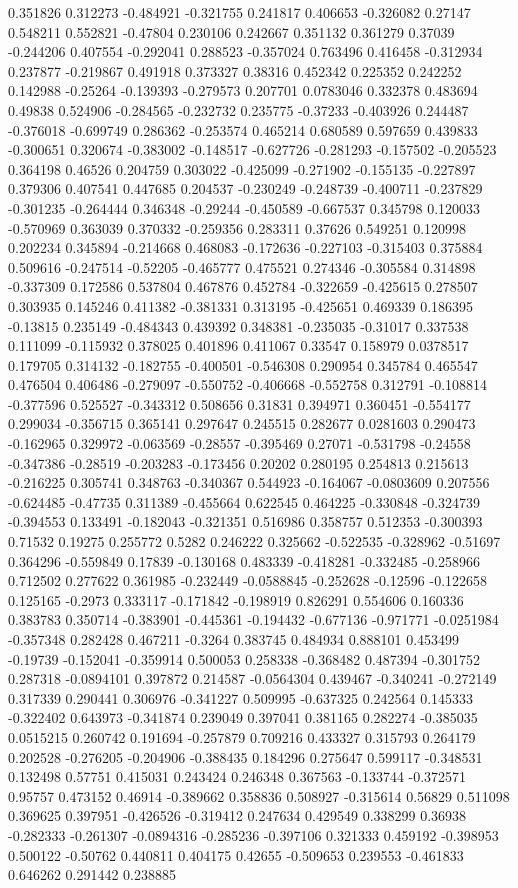 0.351826 0.312273 -0.484921 -0.321755 0.241817 0.406653 -0.326082 0.27147 0.548211 0.552821 -0.47804 0.230106 0.242667 0.351132 0.361279 0.37039 -0.244206 0.407554 -0.292041 0.288523 -0.357024 0.763496 0.416458 -0.312934 0.237877 -0.219867 0.491918 0.373327 0.38316 0.452342 0.225352 0.242252 0.142988 -0.25264 -0.139393 -0.279573 0.207701 0.0783046 0.332378 0.483694 0.49838 0.524906 -0.284565 -0.232732 0.235775 -0.37233 -0.403926 0.244487 -0.376018 -0.699749 0.286362 -0.253574 0.465214 0.680589 0.597659 0.439833 -0.300651 0.320674 -0.383002 -0.148517 -0.627726 -0.281293 -0.157502 -0.205523 0.364198 0.46526 0.204759 0.303022 -0.425099 -0.271902 -0.155135 -0.227897 0.379306 0.407541 0.447685 0.204537 -0.230249 -0.248739 -0.400711 -0.237829 -0.301235 -0.264444 0.346348 -0.29244 -0.450589 -0.667537 0.345798 0.120033 -0.570969 0.363039 0.370332 -0.259356 0.283311 0.37626 0.549251 0.120998 0.202234 0.345894 -0.214668 0.468083 -0.172636 -0.227103 -0.315403 0.375884 0.509616 -0.247514 -0.52205 -0.465777 0.475521 0.274346 -0.305584 0.314898 -0.337309 0.172586 0.537804 0.467876 0.452784 -0.322659 -0.425615 0.278507 0.303935 0.145246 0.411382 -0.381331 0.313195 -0.425651 0.469339 0.186395 -0.13815 0.235149 -0.484343 0.439392 0.348381 -0.235035 -0.31017 0.337538 0.111099 -0.115932 0.378025 0.401896 0.411067 0.33547 0.158979 0.0378517 0.179705 0.314132 -0.182755 -0.400501 -0.546308 0.290954 0.345784 0.465547 0.476504 0.406486 -0.279097 -0.550752 -0.406668 -0.552758 0.312791 -0.108814 -0.377596 0.525527 -0.343312 0.508656 0.31831 0.394971 0.360451 -0.554177 0.299034 -0.356715 0.365141 0.297647 0.245515 0.282677 0.0281603 0.290473 -0.162965 0.329972 -0.063569 -0.28557 -0.395469 0.27071 -0.531798 -0.24558 -0.347386 -0.28519 -0.203283 -0.173456 0.20202 0.280195 0.254813 0.215613 -0.216225 0.305741 0.348763 -0.340367 0.544923 -0.164067 -0.0803609 0.207556 -0.624485 -0.47735 0.311389 -0.455664 0.622545 0.464225 -0.330848 -0.324739 -0.394553 0.133491 -0.182043 -0.321351 0.516986 0.358757 0.512353 -0.300393 0.71532 0.19275 0.255772 0.5282 0.246222 0.325662 -0.522535 -0.328962 -0.51697 0.364296 -0.559849 0.17839 -0.130168 0.483339 -0.418281 -0.332485 -0.258966 0.712502 0.277622 0.361985 -0.232449 -0.0588845 -0.252628 -0.12596 -0.122658 0.125165 -0.2973 0.333117 -0.171842 -0.198919 0.826291 0.554606 0.160336 0.383783 0.350714 -0.383901 -0.445361 -0.194432 -0.677136 -0.971771 -0.0251984 -0.357348 0.282428 0.467211 -0.3264 0.383745 0.484934 0.888101 0.453499 -0.19739 -0.152041 -0.359914 0.500053 0.258338 -0.368482 0.487394 -0.301752 0.287318 -0.0894101 0.397872 0.214587 -0.0564304 0.439467 -0.340241 -0.272149 0.317339 0.290441 0.306976 -0.341227 0.509995 -0.637325 0.242564 0.145333 -0.322402 0.643973 -0.341874 0.239049 0.397041 0.381165 0.282274 -0.385035 0.0515215 0.260742 0.191694 -0.257879 0.709216 0.433327 0.315793 0.264179 0.202528 -0.276205 -0.204906 -0.388435 0.184296 0.275647 0.599117 -0.348531 0.132498 0.57751 0.415031 0.243424 0.246348 0.367563 -0.133744 -0.372571 0.95757 0.473152 0.46914 -0.389662 0.358836 0.508927 -0.315614 0.56829 0.511098 0.369625 0.397951 -0.426526 -0.319412 0.247634 0.429549 0.338299 0.36938 -0.282333 -0.261307 -0.0894316 -0.285236 -0.397106 0.321333 0.459192 -0.398953 0.500122 -0.50762 0.440811 0.404175 0.42655 -0.509653 0.239553 -0.461833 0.646262 0.291442 0.238885 